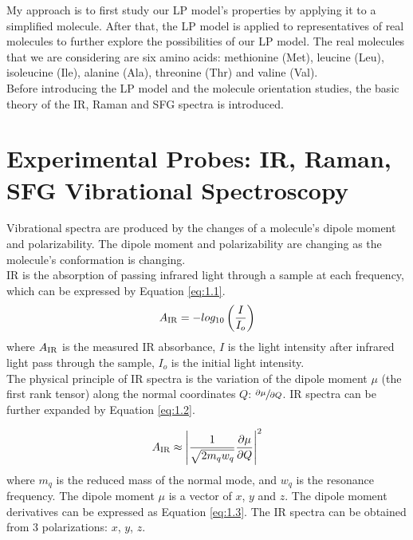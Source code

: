 My approach is to first study our LP model's properties by applying it to a simplified molecule. After that, the LP model is applied to representatives of real molecules to further explore the possibilities of our LP model. The real molecules that we are considering are six amino acids: methionine (Met), leucine (Leu), isoleucine (Ile), alanine (Ala), threonine (Thr) and valine (Val).\\

Before introducing the LP model and the molecule orientation studies, the basic theory of  the IR, Raman and SFG spectra is introduced.\\

\section{Experimental Probes: IR, Raman, SFG Vibrational Spectroscopy}
Vibrational spectra are produced by the changes of a molecule's dipole moment and polarizability. The dipole moment and polarizability are changing as the molecule's conformation is changing. \\

IR is the absorption of passing infrared light through a sample at each frequency, which can be expressed by Equation \ref{eq:1.1}. \\

\begin{equation} \label{eq:1.1}
A_{\rm IR} = - log_{10} \left( \frac{I}{I_{o}} \right)
\end{equation}
where $A_{\rm IR}$ is the measured IR absorbance, $I$ is the light intensity after infrared light pass through the sample, $I_{o}$ is the initial light intensity. \\

The physical principle of IR spectra is the variation of the dipole moment $\mu$ (the first rank tensor) along the normal coordinates $Q$: $\sfrac{\partial\mu}{\partial Q}$. IR spectra can be further expanded by Equation \ref{eq:1.2}.

\begin{equation} \label{eq:1.2}
A_{\rm IR} \approx \left| \frac{1}{\sqrt{2m_{q}w_{q}}} \frac{\partial\mu}{\partial Q} \right|^{2}
\end{equation}
where $m_{q}$ is the reduced mass of the normal mode, and $w_{q}$ is the resonance frequency. The dipole moment $\mu$ is a vector of $x$, $y$ and $z$. The dipole moment derivatives can be expressed as Equation \ref{eq:1.3}. The IR spectra can be obtained from 3 polarizations: $x$, $y$, $z$. \\


